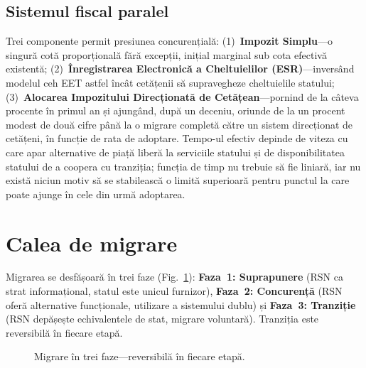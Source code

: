 \documentclass[11pt,a4paper,twocolumn]{article}
\begin{document}
\subsection{Sistemul fiscal paralel}

Trei componente permit presiunea concurențială: (1)~\textbf{Impozit Simplu}---o singură cotă proporțională fără excepții, inițial marginal sub cota efectivă existentă; (2)~\textbf{Înregistrarea Electronică a Cheltuielilor (ESR)}---inversând modelul ceh EET astfel încât cetățenii să supravegheze cheltuielile statului; (3)~\textbf{Alocarea Impozitului Direcționată de Cetățean}---pornind de la câteva procente în primul an și ajungând, după un deceniu, oriunde de la un procent modest de două cifre până la o migrare completă către un sistem direcționat de cetățeni, în funcție de rata de adoptare. Tempo-ul efectiv depinde de viteza cu care apar alternative de piață liberă la serviciile statului și de disponibilitatea statului de a coopera cu tranziția; funcția de timp nu trebuie să fie liniară, iar nu există niciun motiv să se stabilească o limită superioară pentru punctul la care poate ajunge în cele din urmă adoptarea.

\section{Calea de migrare}

Migrarea se desfășoară în trei faze (Fig.~\ref{fig:migration}): \textbf{Faza~1: Suprapunere} (RSN ca strat informațional, statul este unicul furnizor), \textbf{Faza~2: Concurență} (RSN oferă alternative funcționale, utilizare a sistemului dublu) și \textbf{Faza~3: Tranziție} (RSN depășește echivalentele de stat, migrare voluntară). Tranziția este reversibilă în fiecare etapă.

\begin{figure}[ht]
\centering
{}
\caption{Migrare în trei faze---reversibilă în fiecare etapă.}
\label{fig:migration}
\end{figure}
\end{document}
